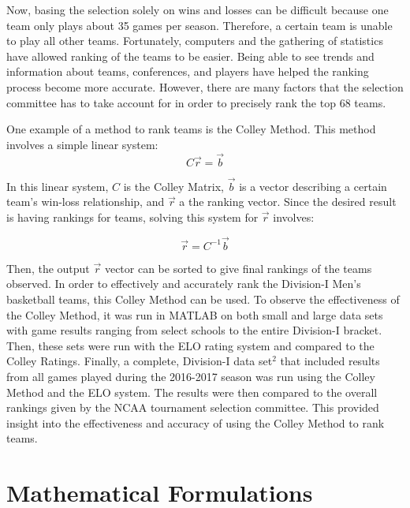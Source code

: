 \documentclass{article}
\begin{document}
Now, basing the selection solely on wins and losses can be difficult because one team only plays about 35 games per season. Therefore, a certain team is unable to play all other teams. Fortunately, computers and the gathering of statistics have allowed ranking of the teams to be easier. Being able to see trends and information about teams, conferences, and players have helped the ranking process become more accurate. However, there are many factors that the selection committee has to take account for in order to precisely rank the top 68 teams.

One example of a method to rank teams is the Colley Method. This method involves a simple linear system:
\begin{equation}
C \vec{r} = \vec{b}
\end{equation}


In this linear system, $C$ is the Colley Matrix, $\vec{b}$ is a vector describing a certain team's win-loss relationship, and $\vec{r}$ a the ranking vector. Since the desired result is having rankings for teams, solving this system for $\vec{r}$ involves:

\begin{equation}
\vec{r} = C^{-1} \vec{b}
\label{eq:r}
\end{equation}


Then, the output $\vec{r}$ vector can be sorted to give final rankings of the teams observed. In order to effectively and accurately rank the Division-I Men's basketball teams, this Colley Method can be used. To observe the effectiveness of the Colley Method, it was run in MATLAB on both small and large data sets with game results ranging from select schools to the entire Division-I bracket. Then, these sets were run with the ELO rating system and compared to the Colley Ratings. Finally, a complete, Division-I data set$^{2}$ that included results from all games played during the 2016-2017 season was run using the Colley Method and the ELO system. The results were then compared to the overall rankings given by the NCAA tournament selection committee. This provided insight into the effectiveness and accuracy of using the Colley Method to rank teams.
\section{Mathematical Formulations}
\end{document}
